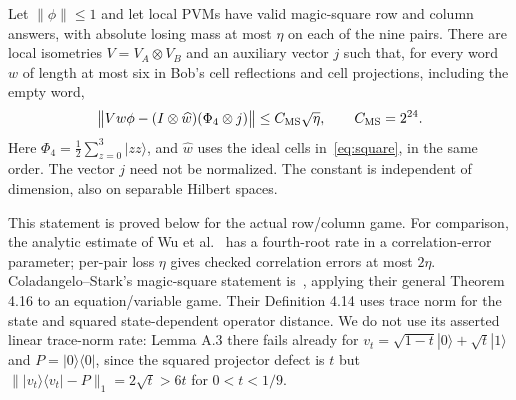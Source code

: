 \begin{theorem}\label{thm:wordextraction}
Let $\|\phi\|\leq1$ and let local PVMs have valid magic-square row and column
answers, with absolute losing mass at most $\eta$ on each of the nine pairs.
There are local isometries $V=V_A\otimes V_B$ and an auxiliary vector $j$
such that, for every word $w$ of length at most six in Bob's cell reflections
and cell projections, including the empty word,
\begin{equation}\label{eq:wordextraction}
\bigl\|Vw\phi-(I\otimes\widehat w)(\Phi_4\otimes j)\bigr\|
\leq C_{\rm MS}\sqrt\eta,\qquad C_{\rm MS}=2^{24}.
\end{equation}
Here $\Phi_4=\frac12\sum_{z=0}^3|zz\rangle$, and $\widehat w$ uses the
ideal cells in~\eqref{eq:square}, in the same order. The vector $j$ need not
be normalized. The constant is independent of dimension, also on separable
Hilbert spaces.
\end{theorem}

This statement is proved below for the actual row/column game. For comparison,
the analytic estimate of Wu et al.~\cite[Appendix C, Eq.~(C35)]{WBMS} has a
fourth-root rate in a correlation-error parameter; per-pair loss $\eta$
gives checked correlation errors at most $2\eta$. Coladangelo--Stark's
magic-square statement is~\cite[Theorem 6.9]{CSrobust}, applying their general
Theorem 4.16 to an equation/variable game. Their Definition 4.14 uses trace
norm for the state and squared state-dependent operator distance. We do not
use its asserted linear trace-norm rate: Lemma A.3 there fails already for
$v_t=\sqrt{1-t}|0\rangle+\sqrt t|1\rangle$ and $P=|0\rangle\langle0|$,
since the squared projector defect is $t$ but
$\||v_t\rangle\langle v_t|-P\|_1=2\sqrt t>6t$ for $0<t<1/9$.

